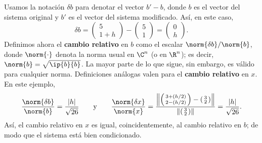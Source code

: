 \begin{ejemplo}
    Usamos la notación $\delta b$ para denotar el vector $b'-b$, donde $b$ es el vector del sistema original y $b'$ es el vector del sistema modificado. Así, en este caso,
    \begin{equation*}
        \delta b=\begin{pmatrix}5\\1+h\end{pmatrix}-\begin{pmatrix}5\\1\end{pmatrix}=\begin{pmatrix}0\\h\end{pmatrix}.
    \end{equation*}
    Definimos ahora el \textbf{cambio relativo} en $b$ como el escalar $\norm{\delta b}/\norm{b}$, donde $\norm{\cdot}$ denota la norma usual en $\C^n$ (o en $\R^n$); es decir, $\norm{b}=\sqrt{\ip{b}{b}}$. La mayor parte de lo que sigue, sin embargo, es válido para cualquier norma. Definiciones análogas valen para el \textbf{cambio relativo} en $x$. En este ejemplo,
    \begin{equation*}
        \frac{\norm{\delta b}}{\norm{b}}=\frac{|h|}{\sqrt{26}}
        \qquad\text{y}\qquad
        \frac{\norm{\delta x}}{\norm{x}}=\frac{\left\lVert\left(\begin{smallmatrix}3+(h/2)\\2-(h/2)\end{smallmatrix}\right)-\left(\begin{smallmatrix}3\\2\end{smallmatrix}\right)\right\rVert}{\left\lVert\left(\begin{smallmatrix}3\\2\end{smallmatrix}\right)\right\rVert}=\frac{|h|}{\sqrt{26}}.
    \end{equation*}
    Así, el cambio relativo en $x$ es igual, coincidentemente, al cambio relativo en $b$; de modo que el sistema está bien condicionado.
\end{ejemplo}

